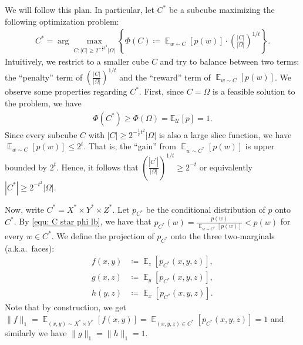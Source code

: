 \documentclass[11pt]{article}
\DeclareMathOperator*{\E}{\mathbb{E}}
\newcommand{\1}{ \mathbbm{1}}
\begin{document}
We will follow this plan. In particular, let $C^*$ be a subcube maximizing the following optimization problem:
\begin{align}
C^* = \arg\max_{C:|C|\ge 2^{-\frac{1}{c}t^2}|\Omega|} \left\{ \Phi(C) \coloneqq \E_{w\sim C}[p(w)] \cdot \left( \frac{|C|}{|\Omega|}\right)^{1/t} \right\}. \label{equ:cube-density-optimization}
\end{align}
Intuitively, we restrict to a smaller cube $C$ and try to balance between two terms: the ``penalty'' term of $\left( \frac{|C|}{|\Omega|}\right)^{1/t}$ and the ``reward'' term of $\E_{w\sim C}[p(w)]$.
We observe some properties regarding $C^*$. First, since $C=\Omega$ is a feasible solution to the problem, we have
\begin{align}
\Phi(C^*) \ge \Phi(\Omega) = \mathbb{E}_{\mathcal{U}}[p] = 1. \label{equ: C star phi lb}
\end{align}
Since every subcube $C$ with $|C|\ge 2^{-\frac{1}{c}t^2}|\Omega|$ is also a large slice function, we have $\E_{w\sim C}[p(w)]\le 2^t$. That is, the ``gain'' from $\E_{w\sim C^*}[p(w)]$ is upper bounded by $2^{t}$. Hence, it follows that $\left( \frac{|C^*|}{|\Omega|} \right)^{1/t}\ge 2^{-t}$ or equivalently $|C^*|\ge 2^{-t^2}|\Omega|$.

Now, write $C^* = X^* \times Y^* \times Z^*$. Let $p_{C^*}$ be the conditional distribution of $p$ onto $C^*$. By \eqref{equ: C star phi lb}, we have that $p_{C^*}(w) = \frac{p(w)}{\E_{w\sim C^*}[p(w)]} < p(w)$ for every $w\in C^*$. We define the projection of $p_{C^*}$ onto the three two-marginals (a.k.a.~faces):
$$
\begin{aligned}
f(x,y) &\coloneqq \E_{z}[p_{C^*}(x,y,z)], \\
g(x,z) &\coloneqq \E_{y}[p_{C^*}(x,y,z)], \\
h(y,z) &\coloneqq \E_{x}[p_{C^*}(x,y,z)].
\end{aligned}
$$
Note that by construction, we get $\|f\|_1 = \E_{(x,y)\sim X^*\times Y^*}[f(x,y)] = \E_{(x,y,z)\in C^*}[p_{C^*}(x,y,z)] = 1$ and similarly we have $\|g\|_1 = \|h\|_1 = 1$.
\end{document}
